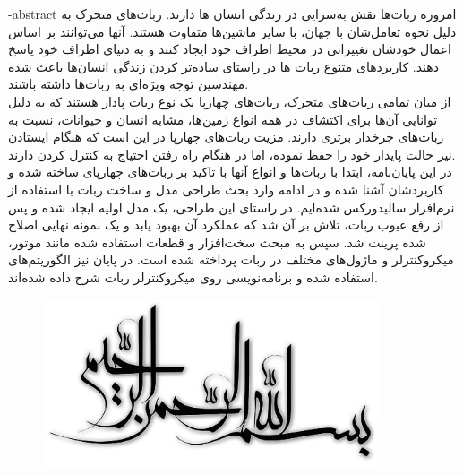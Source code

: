 
\fa-abstract{
امروزه ربات‌ها نقش به‌سزایی در زندگی انسان ها دارند. ربات‌های متحرک به دلیل نحوه تعامل‌شان با جهان، با سایر ماشین‌ها متفاوت هستند. آنها می‌توانند بر اساس اعمال خودشان تغییراتی در محیط اطراف خود ایجاد کنند و به دنیای اطراف خود پاسخ دهند. کاربردهای متنوع ربات ها در راستای ساده‌تر کردن زندگی انسان‌ها باعث شده مهندسین توجه ویژه‌ای به ربات‌ها داشته باشند.
\\
از میان تمامی ربات‌های متحرک، ربات‌های چهارپا یک نوع ربات پادار هستند که به دلیل توانایی آن‌ها برای اکتشاف در همه انواع زمین‌ها، مشابه انسان و حیوانات، نسبت به ربات‌های چرخدار برتری دارند. مزیت ربات‌های چهارپا در این است که هنگام ایستادن نیز حالت پایدار خود را حفظ نموده، اما در هنگام راه رفتن احتیاج به کنترل کردن دارند. 
\\
در این پایان‌نامه، ابتدا با ربات‌ها و انواع آنها با تاکید بر ربات‌های چهارپای ساخته شده و کاربردشان آشنا شده و در ادامه وارد بحث طراحی مدل و ساخت ربات با استفاده از نرم‌افزار سالیدورکس شده‌ایم. در راستای این طراحی، یک مدل اولیه ایجاد شده و پس از رفع عیوب ربات، تلاش بر آن شد که عملکرد آن بهبود یابد و یک نمونه نهایی اصلاح شده پرینت شد. سپس به مبحث سخت‌افزار و قطعات استفاده شده مانند موتور، میکروکنترلر و ماژول‌های مختلف در ربات پرداخته شده است. در پایان نیز الگوریتم‌های استفاده شده و برنامه‌نویسی روی میکروکنترلر ربات شرح داده شده‌اند. 
}





\AUTtitle
\vspace*{7cm}
\thispagestyle{empty}
\begin{center}
	\includegraphics[height=5cm,width=12cm]{besm}
\end{center}